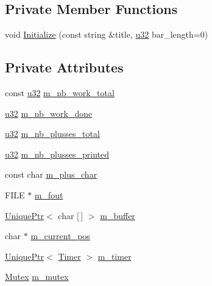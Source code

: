 \subsection*{Private Member Functions}
\begin{DoxyCompactItemize}
\item 
void \hyperlink{classmage_1_1_progress_reporter_ad65adf3973c5c7dbb354b240571317d2}{Initialize} (const string \&title, \hyperlink{namespacemage_af2b398bf98eb10351f49cad73fe2cc73}{u32} bar\+\_\+length=0)
\end{DoxyCompactItemize}
\subsection*{Private Attributes}
\begin{DoxyCompactItemize}
\item 
const \hyperlink{namespacemage_af2b398bf98eb10351f49cad73fe2cc73}{u32} \hyperlink{classmage_1_1_progress_reporter_aca53f49ef3f6a9773a1cda7e74790267}{m\+\_\+nb\+\_\+work\+\_\+total}
\item 
\hyperlink{namespacemage_af2b398bf98eb10351f49cad73fe2cc73}{u32} \hyperlink{classmage_1_1_progress_reporter_a46d9622fbcb30bcc142a3f028365505f}{m\+\_\+nb\+\_\+work\+\_\+done}
\item 
\hyperlink{namespacemage_af2b398bf98eb10351f49cad73fe2cc73}{u32} \hyperlink{classmage_1_1_progress_reporter_a541874e40cf7f9f2ff6b84c7c11d48cb}{m\+\_\+nb\+\_\+plusses\+\_\+total}
\item 
\hyperlink{namespacemage_af2b398bf98eb10351f49cad73fe2cc73}{u32} \hyperlink{classmage_1_1_progress_reporter_ab76274a96e0a753877da8d63b9cf797d}{m\+\_\+nb\+\_\+plusses\+\_\+printed}
\item 
const char \hyperlink{classmage_1_1_progress_reporter_ab3c8d12e79e63ae2b99fde8d6627c230}{m\+\_\+plus\+\_\+char}
\item 
F\+I\+LE $\ast$ \hyperlink{classmage_1_1_progress_reporter_ad325ee5978fd1d16a97acbe37a977982}{m\+\_\+fout}
\item 
\hyperlink{namespacemage_a3316d7143a973e37adf1110f2e80ca31}{Unique\+Ptr}$<$ char \mbox{[}$\,$\mbox{]} $>$ \hyperlink{classmage_1_1_progress_reporter_a725763db34f5bbb7408107d55ee43beb}{m\+\_\+buffer}
\item 
char $\ast$ \hyperlink{classmage_1_1_progress_reporter_a7adafaaf90edf29c8c27f4008aea41c9}{m\+\_\+current\+\_\+pos}
\item 
\hyperlink{namespacemage_a3316d7143a973e37adf1110f2e80ca31}{Unique\+Ptr}$<$ \hyperlink{classmage_1_1_timer}{Timer} $>$ \hyperlink{classmage_1_1_progress_reporter_a4c5c81ce84ceaab7764bd640a18db788}{m\+\_\+timer}
\item 
\hyperlink{structmage_1_1_mutex}{Mutex} \hyperlink{classmage_1_1_progress_reporter_a32a499aa1b8fccbc8393fe32305dfeb1}{m\+\_\+mutex}
\end{DoxyCompactItemize}


